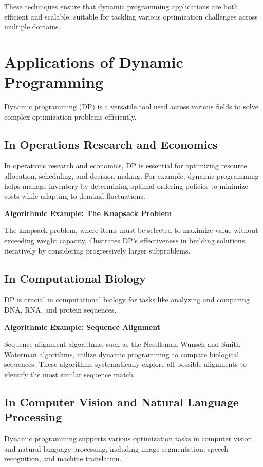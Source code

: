 \documentclass[12pt]{book} %
\begin{document}
These techniques ensure that dynamic programming applications are both efficient and scalable, suitable for tackling various optimization challenges across multiple domains.


\section{Applications of Dynamic Programming}

Dynamic programming (DP) is a versatile tool used across various fields to solve complex optimization problems efficiently.

\subsection{In Operations Research and Economics}

In operations research and economics, DP is essential for optimizing resource allocation, scheduling, and decision-making. For example, dynamic programming helps manage inventory by determining optimal ordering policies to minimize costs while adapting to demand fluctuations.

\textbf{Algorithmic Example: The Knapsack Problem}

The knapsack problem, where items must be selected to maximize value without exceeding weight capacity, illustrates DP's effectiveness in building solutions iteratively by considering progressively larger subproblems.

\subsection{In Computational Biology}

DP is crucial in computational biology for tasks like analyzing and comparing DNA, RNA, and protein sequences.

\textbf{Algorithmic Example: Sequence Alignment}

Sequence alignment algorithms, such as the Needleman-Wunsch and Smith-Waterman algorithms, utilize dynamic programming to compare biological sequences. These algorithms systematically explore all possible alignments to identify the most similar sequence match.

\subsection{In Computer Vision and Natural Language Processing}

Dynamic programming supports various optimization tasks in computer vision and natural language processing, including image segmentation, speech recognition, and machine translation.
\end{document}
